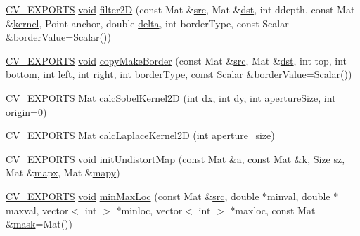 \begin{DoxyCompactItemize}
\item 
\hyperlink{core_2types__c_8h_a1bf9f0e121b54272da02379cfccd0a2b}{C\-V\-\_\-\-E\-X\-P\-O\-R\-T\-S} \hyperlink{legacy_8hpp_a8bb47f092d473522721002c86c13b94e}{void} \hyperlink{namespacecvtest_aa48e1cd9d730d55e3d89a5932da6139b}{filter2\-D} (const Mat \&\hyperlink{legacy_8hpp_a371cd109b74033bc4366f584edd3dacc}{src}, Mat \&\hyperlink{photo__c_8h_aed13e2a25279b24dc954073233fef7a5}{dst}, int ddepth, const Mat \&\hyperlink{imgproc__c_8h_a863a75780ba6c5de552f5361cb0d2c89}{kernel}, Point anchor, double \hyperlink{legacy_8hpp_ac867054f00f4be8b1f3ebce6fba31982}{delta}, int border\-Type, const Scalar \&border\-Value=Scalar())
\item 
\hyperlink{core_2types__c_8h_a1bf9f0e121b54272da02379cfccd0a2b}{C\-V\-\_\-\-E\-X\-P\-O\-R\-T\-S} \hyperlink{legacy_8hpp_a8bb47f092d473522721002c86c13b94e}{void} \hyperlink{namespacecvtest_afdeafc9424ce61318e29085a27622816}{copy\-Make\-Border} (const Mat \&\hyperlink{legacy_8hpp_a371cd109b74033bc4366f584edd3dacc}{src}, Mat \&\hyperlink{photo__c_8h_aed13e2a25279b24dc954073233fef7a5}{dst}, int top, int bottom, int left, int \hyperlink{legacy_8hpp_a6b04b878081bf724144b73c75dfd1894}{right}, int border\-Type, const Scalar \&border\-Value=Scalar())
\item 
\hyperlink{core_2types__c_8h_a1bf9f0e121b54272da02379cfccd0a2b}{C\-V\-\_\-\-E\-X\-P\-O\-R\-T\-S} Mat \hyperlink{namespacecvtest_a7d10f1488683810d8954900653e3996d}{calc\-Sobel\-Kernel2\-D} (int dx, int dy, int aperture\-Size, int origin=0)
\item 
\hyperlink{core_2types__c_8h_a1bf9f0e121b54272da02379cfccd0a2b}{C\-V\-\_\-\-E\-X\-P\-O\-R\-T\-S} Mat \hyperlink{namespacecvtest_a95a6a03cbf86d721168e03fe6096f649}{calc\-Laplace\-Kernel2\-D} (int aperture\-\_\-size)
\item 
\hyperlink{core_2types__c_8h_a1bf9f0e121b54272da02379cfccd0a2b}{C\-V\-\_\-\-E\-X\-P\-O\-R\-T\-S} \hyperlink{legacy_8hpp_a8bb47f092d473522721002c86c13b94e}{void} \hyperlink{namespacecvtest_aa74e3cb54c90fa2d263fe3ff81a0c9fe}{init\-Undistort\-Map} (const Mat \&\hyperlink{legacy_8hpp_a1031d0e0a97a340abfe0a6ab9e831045}{a}, const Mat \&\hyperlink{legacy_8hpp_a7be9b6436e5ea72ff5d5a66779b4bd38}{k}, Size sz, Mat \&\hyperlink{imgproc__c_8h_a81ed33f30ee89704887ae4e4dbb20d46}{mapx}, Mat \&\hyperlink{imgproc__c_8h_a934abd37467ed645178fbe201add061e}{mapy})
\item 
\hyperlink{core_2types__c_8h_a1bf9f0e121b54272da02379cfccd0a2b}{C\-V\-\_\-\-E\-X\-P\-O\-R\-T\-S} \hyperlink{legacy_8hpp_a8bb47f092d473522721002c86c13b94e}{void} \hyperlink{namespacecvtest_a99c63c88a0832d8e71bfe2779dc28af4}{min\-Max\-Loc} (const Mat \&\hyperlink{legacy_8hpp_a371cd109b74033bc4366f584edd3dacc}{src}, double $\ast$minval, double $\ast$maxval, vector$<$ int $>$ $\ast$minloc, vector$<$ int $>$ $\ast$maxloc, const Mat \&\hyperlink{tracking_8hpp_a6b13ecd2fd6ec7ad422f1d7863c3ad19}{mask}=Mat())

\end{DoxyCompactItemize}

